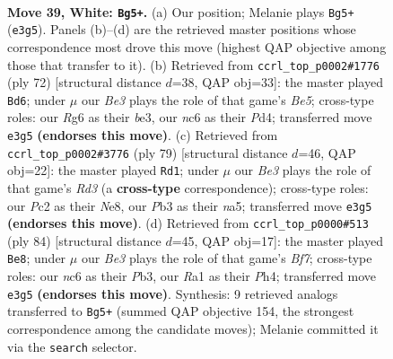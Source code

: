 \documentclass[11pt]{article}
\begin{document}
\clearpage

\begin{figure}[p]\centering
\begin{subfigure}{0.46\textwidth}\centering
\resizebox{\linewidth}{!}{%
\newchessgame
\chessboard[
  setfen={r7/3bk3/2n3R1/8/1p1p2P1/pP2B3/P1PN3K/R7 w - - 0 39},
  showmover=false,
  pgfstyle=straightmove, color=movearrow, markmove={e3-g5}
]}
\caption{}
\end{subfigure}\hfill
\begin{subfigure}{0.46\textwidth}\centering
\resizebox{\linewidth}{!}{%
\newchessgame
\chessboard[
  setfen={6k1/1p4p1/4pp2/1NPnB3/r2P2PP/4bK2/8/1R6 w - - 0 37},
  showmover=false,
  pgfstyle=straightmove, color=movearrow, markmove={e5-d6}
]}
\caption{}
\end{subfigure}
\\[4pt]
\begin{subfigure}{0.46\textwidth}\centering
\resizebox{\linewidth}{!}{%
\newchessgame
\chessboard[
  setfen={4n3/5p1k/3rp3/NP4p1/K1P1N1bp/6P1/8/4R3 b - - 3 40},
  showmover=false,
  pgfstyle=straightmove, color=movearrow, markmove={d6-d1}
]}
\caption{}
\end{subfigure}\hfill
\begin{subfigure}{0.46\textwidth}\centering
\resizebox{\linewidth}{!}{%
\newchessgame
\chessboard[
  setfen={7k/1R3B1p/2p3p1/p3n3/7P/1Pr3P1/5P2/5K2 w - - 12 43},
  showmover=false,
  pgfstyle=straightmove, color=movearrow, markmove={f7-e8}
]}
\caption{}
\end{subfigure}
\caption{\textbf{Move 39, White: \texttt{Bg5+}.} (a) Our position; Melanie plays \texttt{Bg5+} (\texttt{e3g5}). Panels (b)--(d) are the retrieved master positions whose correspondence most drove this move (highest QAP objective among those that transfer to it). (b) Retrieved from \texttt{ccrl\_top\_p0002\#1776} (ply 72) [structural distance $d$=38, QAP obj=33]: the master played \texttt{Bd6}; under $\mu$ our \emph{Be3} plays the role of that game's \emph{Be5}; cross-type roles: our \emph{R}g6 as their \emph{b}e3, our \emph{n}c6 as their \emph{P}d4; transferred move \texttt{e3g5} \textbf{(endorses this move)}. (c) Retrieved from \texttt{ccrl\_top\_p0002\#3776} (ply 79) [structural distance $d$=46, QAP obj=22]: the master played \texttt{Rd1}; under $\mu$ our \emph{Be3} plays the role of that game's \emph{Rd3} (a \textbf{cross-type} correspondence); cross-type roles: our \emph{P}c2 as their \emph{N}e8, our \emph{P}b3 as their \emph{n}a5; transferred move \texttt{e3g5} \textbf{(endorses this move)}. (d) Retrieved from \texttt{ccrl\_top\_p0000\#513} (ply 84) [structural distance $d$=45, QAP obj=17]: the master played \texttt{Be8}; under $\mu$ our \emph{Be3} plays the role of that game's \emph{Bf7}; cross-type roles: our \emph{n}c6 as their \emph{P}b3, our \emph{R}a1 as their \emph{P}h4; transferred move \texttt{e3g5} \textbf{(endorses this move)}. Synthesis: 9 retrieved analogs transferred to \texttt{Bg5+} (summed QAP objective 154, the strongest correspondence among the candidate moves); Melanie committed it via the \texttt{search} selector.}
\label{fig:thought-m76}
\end{figure}
\end{document}
